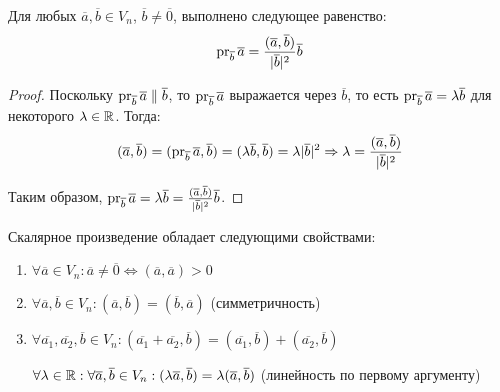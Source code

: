 \begin{proposition}
	Для любых $\overline{a}, \overline{b} \in V_n$, $\overline{b} \ne \overline{0}$, выполнено следующее равенство:
	\[\operatorname{pr}_{\overline{b}}\overline{a} = \frac{(\overline{a}, \overline{b})}{|\overline{b}|^2}\overline{b}\]
\end{proposition}

\begin{proof}
	Поскольку $\operatorname{pr}_{\overline{b}}\overline{a} \parallel \overline{b}$, то $\operatorname{pr}_{\overline{b}}\overline{a}$ выражается через $\overline b$, то есть $\operatorname{pr}_{\overline{b}}\overline{a} = \lambda\overline{b}$ для некоторого $\lambda \in \mathbb{R}$. Тогда:
	\[
	(\overline{a}, \overline{b}) = (\operatorname{pr}_{\overline{b}}\overline{a}, \overline{b}) = (\lambda\overline{b}, \overline{b}) = \lambda |\overline{b}|^2 \Rightarrow \lambda = \frac{(\overline{a}, \overline{b})}{|\overline{b}|^2}\]
	
	Таким образом, $\operatorname{pr}_{\overline{b}}\overline{a} = \lambda\overline{b} = \frac{(\overline{a}, \overline{b})}{|\overline{b}|^2}\overline{b}$.
\end{proof}

\begin{theorem}
	Скалярное произведение обладает следующими свойствами:
	\begin{enumerate}
		\item $\forall \overline{a} \in V_n: \overline{a} \ne \overline{0} \Leftrightarrow (\overline{a}, \overline{a}) > 0$
		\item $\forall \overline{a}, \overline{b} \in V_n: (\overline{a}, \overline{b}) = (\overline{b}, \overline{a})$ (симметричность)
		\item $\forall \overline{a_1}, \overline{a_2}, \overline{b} \in V_n: (\overline{a_1} + \overline{a_2}, \overline{b}) = (\overline{a_1}, \overline{b}) + (\overline{a_2}, \overline{b})$
		
		$\forall \lambda \in \mathbb{R}: \forall \overline{a}, \overline{b} \in V_n: (\lambda\overline{a}, \overline{b}) = \lambda(\overline{a}, \overline{b})$ (линейность по первому аргументу)
	\end{enumerate}
\end{theorem}

